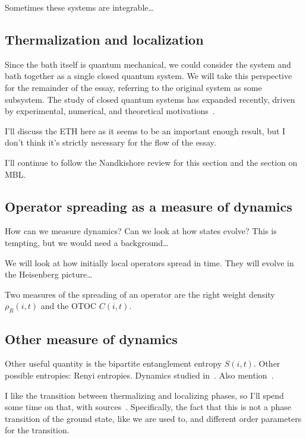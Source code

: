 \documentclass[a4paper,12pt]{article}
\begin{document}
Sometimes these systems are integrable\dots

\subsection{Thermalization and localization} \label{sub:therm}

Since the bath itself is quantum mechanical, we could consider the system and bath together as a single closed quantum system. We will take this perspective for the remainder of the essay, referring to the original system as some subsystem. The study of closed quantum systems has expanded recently, driven by experimental, numerical, and theoretical motivations~\cite{GogolinStatMech}.

I'll discuss the ETH here as it seems to be an important enough result, but I don't think it's strictly necessary for the flow of the essay.

I'll continue to follow the Nandkishore review for this section and the section on MBL.

\subsection{Operator spreading as a measure of dynamics} \label{sub:opsp}

How can we measure dynamics?
Can we look at how states evolve?
This is tempting, but we would need a background\dots

We will look at how initially local operators spread in time. They will evolve in the Heisenberg picture\dots

Two measures of the spreading of an operator are the right weight density $\rho_R(i,t)$ and the OTOC $C(i,t)$.

\subsection{Other measure of dynamics} \label{sub:other}

Other useful quantity is the bipartite entanglement entropy $S(i,t)$.
Other possible entropies: Renyi entropies.
Dynamics studied in~\cite{RakovskyDiff, HuangRenyi}.
Also mention~\cite{JonayEntanglement}.

I like the transition between thermalizing and localizing phases, so I'll spend some time on that, with sources~\cite{PalHuse, KhemaniCP}. Specifically, the fact that this is not a phase transition of the ground state, like we are used to, and different order parameters for the transition. 
\end{document}
